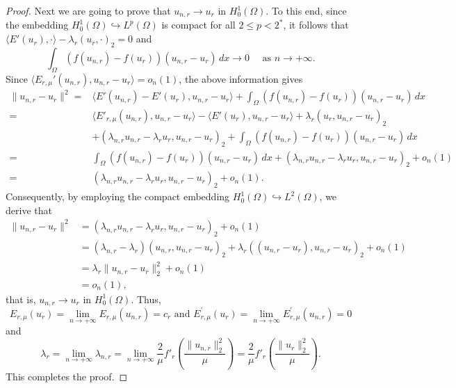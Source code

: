 \documentclass[11pt]{amsart}
\newcommand{\norm}[1]{\lVert#1\rVert}
\numberwithin{equation}{section}
\begin{document}
\begin{proof}
    Next we are going to prove that $u_{n,r} \to u_{r}$ in $H^1_0(\Omega)$. To this end, since the embedding $H^1_0(\Omega)\hookrightarrow L^p(\Omega)$ is compact for all $2\leq p<2^*$, it follows that $\langle E'(u_{r}), \cdot \rangle - \lambda_{r}(u_r,\cdot)_2=0$ and
\begin{equation*}
    \int_{\Omega} \left(f(u_{n,r})-f(u_{r})\right)(u_{n,r}-u_{r}) \, dx \to 0 \quad \text{ as }  n \to +\infty.
\end{equation*}
Since $\langle E_{r,\mu}'(u_{n,r}),u_{n,r}-u_r\rangle=o_n(1)$, the above information gives
\begin{equation*}
\begin{aligned}
    \norm{u_{n,r}-u_{r}}^{2}=&\langle E'(u_{n,r})-E'(u_r), u_{n,r}-u_r \rangle +\int_{\Omega} \left(f(u_{n,r})-f(u_{r})\right)(u_{n,r}-u_{r}) \, dx\\
    =&\langle E'_{r,\mu}(u_{n,r}), u_{n,r}-u_r \rangle -\langle E'(u_r), u_{n,r}-u_r \rangle+\lambda_{r}(u_r,u_{n,r}-u_r)_2 \\&+(\lambda_{n,r}  u_{n,r}-\lambda_{r} u_{r}, u_{n,r}-u_{r})_{2}+\int_{\Omega} \left(f(u_{n,r})-f(u_{r})\right)(u_{n,r}-u_{r}) \, dx\\
    =&\int_{\Omega} \left(f(u_{n,r})-f(u_{r})\right)(u_{n,r}-u_{r}) \, dx+(\lambda_{n,r}  u_{n,r}-\lambda_{r} u_{r}, u_{n,r}-u_{r})_{2}+o_{n}(1)\\
    =&(\lambda_{n,r}  u_{n,r}-\lambda_{r} u_{r}, u_{n,r}-u_{r})_{2}+o_{n}(1).
\end{aligned}
\end{equation*}
Consequently, by employing the compact embedding $H^1_0(\Omega)\hookrightarrow L^2(\Omega)$, we derive that
\begin{equation*}
   \begin{aligned}
   \norm{u_{n,r}-u_{r}}^{2}&=
(\lambda_{n,r}  u_{n,r}-\lambda_{r} u_{r}, u_{n,r}-u_{r})_{2}+o_{n}(1)\\
&=(\lambda_{n,r}-\lambda_{r})(u_{n,r}, u_{n,r}-u_{r})_{2}+\lambda_{r}((u_{n,r}-u_{r}), u_{n,r}-u_{r})_{2}+o_{n}(1)\\
&=\lambda_{r}\norm{u_{n,r}-u_{r}}_{2}^{2}+o_{n}(1)\\
&=o_{n}(1),
\end{aligned}
\end{equation*}
that is, $u_{n,r}\to u_{r}$ in $H^1_0(\Omega)$. Thus,
$$
E_{r,\mu}(u_{r}) = \lim\limits_{n \to +\infty}E_{r,\mu}(u_{n,r}) =c_r\,\,\text{and}\,\, E_{r,\mu}^\prime(u_{r}) = \lim\limits_{n \to +\infty}E_{r,\mu}^\prime(u_{n,r}) =0
$$
and
$$
\lambda_r = \lim_{n \to +\infty}\lambda_{n,r}=\lim_{n \to +\infty}\frac{2}{\mu}f'_r\left(\frac{\norm{u_{n,r}}_2^2}{\mu}\right) = \frac{2}{\mu}f'_r\left(\frac{\norm{u_r}_2^2}{\mu}\right).
$$
This completes the proof.
\end{proof}
\end{document}
